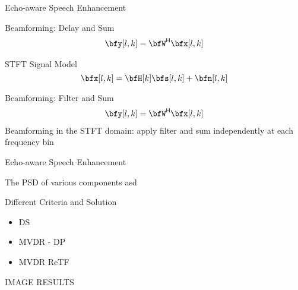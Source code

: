 \begin{frame}[t]{Echo-aware Speech Enhancement}

    \begin{block}{Beamforming: Delay and Sum}
        \begin{equation*}
            \begin{aligned}
                \bfy[l,k] = \khermitian{\bfW} \bfx[l,k]
            \end{aligned}
        \end{equation*}
    \end{block}

    \begin{block}{STFT Signal Model}
        \begin{equation*}
            \bfx[l,k] =\bfH[k] \bfs[l,k] + \bfn[l,k]
        \end{equation*}
    \end{block}

    \begin{block}{Beamforming: Filter and Sum}
        \begin{equation*}
            \begin{aligned}
                \bfy[l,k] = \khermitian{\bfW} \bfx[l,k]
            \end{aligned}
        \end{equation*}
        Beamforming in the STFT domain: apply filter and sum independently at each frequency bin
    \end{block}

\end{frame}

\begin{frame}[t]{Echo-aware Speech Enhancement}

    \begin{block}{The PSD of various components}
        asd
    \end{block}

    \begin{block}{Different Criteria and Solution}
        \begin{itemize}
            \item DS
            \item MVDR - DP
            \item MVDR ReTF
        \end{itemize}
    \end{block}

    IMAGE RESULTS

\end{frame}

